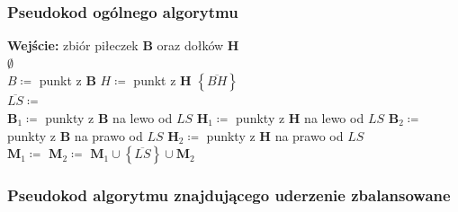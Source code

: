 \documentclass[10pt,a4paper]{article}
\begin{document}
	\subsubsection{Pseudokod ogólnego algorytmu}

	\begin{algorithmic}
		\State \textbf{Wejście:} zbiór piłeczek $\mathbf{B}$ oraz dołków $\mathbf{H}$  \\
		
			 
				\State \Return $\emptyset$ 
			\EndIf
			\\
			 
				\State $B \coloneqq $ punkt z $\mathbf{B}$
				\State $H \coloneqq $ punkt z $\mathbf{H}$
				\State \Return $\left\{\overline{BH}\right\}$ 
			\EndIf
			\\
			\State $\overline{LS} \coloneqq$  
			\\
			\State $\mathbf{B}_{1} \coloneqq $ punkty z $\mathbf{B}$ na lewo od $LS$ 
			\State $\mathbf{H}_{1} \coloneqq $ punkty z $\mathbf{H}$ na lewo od $LS$ 
			\State $\mathbf{B}_{2} \coloneqq $ punkty z $\mathbf{B}$ na prawo od $LS$ 
			\State $\mathbf{H}_{2} \coloneqq $ punkty z $\mathbf{H}$ na prawo od $LS$ 
			\\
			\State $\mathbf{M}_{1} \coloneqq $  
			\State $\mathbf{M}_{2} \coloneqq $  
			\State \Return $\mathbf{M}_{1} \cup \left\{\overline{LS}\right\} \cup \mathbf{M}_{2}$
		\EndFunction
	\end{algorithmic}

	\subsubsection{Pseudokod algorytmu znajdującego uderzenie zbalansowane}
	
\end{document}
